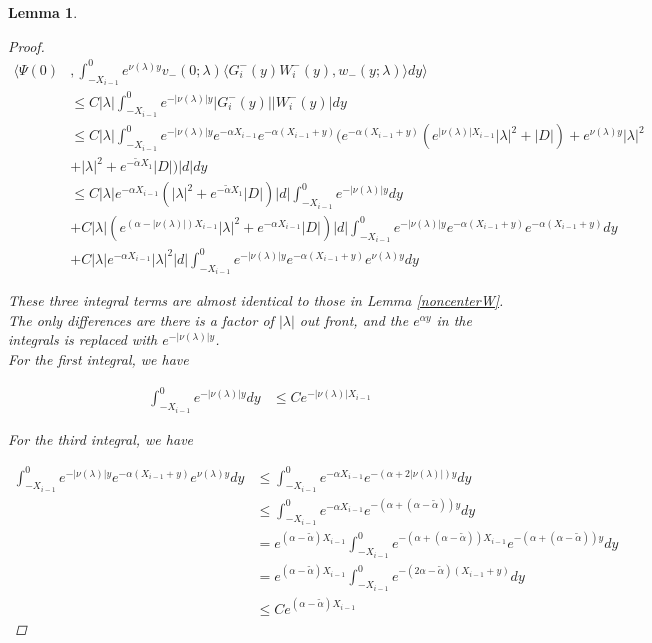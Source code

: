 \documentclass[12pt]{article}
\newtheorem{lemma}{Lemma}
\begin{document}
\begin{lemma}
\begin{proof}
\begin{align*}
\langle \Psi(0) &, \int_{-X_{i-1}}^0
e^{\nu(\lambda)y} v_-(0; \lambda) \langle G_i^-(y)W_i^-(y), w_-(y; \lambda) \rangle dy \rangle \\
&\leq C |\lambda| \int_{-X_{i-1}}^0 e^{-|\nu(\lambda)|y} |G_i^-(y)||W_i^-(y)| dy \\
&\leq C |\lambda| \int_{-X_{i-1}}^0 e^{-|\nu(\lambda)|y} e^{-\alpha X_{i-1}} e^{-\alpha(X_{i-1} + y)} \Big(e^{-\alpha(X_{i-1} + y)}( e^{|\nu(\lambda)| X_{i-1}} |\lambda|^2 + |D|) + e^{\nu(\lambda)y} |\lambda|^2 \\
&+ |\lambda|^2 + e^{-\tilde{\alpha} X_1} |D| \Big) |d| dy \\
&\leq C |\lambda| e^{-\alpha X_{i-1}} (|\lambda|^2 + e^{-\tilde{\alpha} X_1} |D| ) |d| \int_{-X_{i-1}}^0 e^{-|\nu(\lambda)|y} dy \\
&+ C |\lambda| ( e^{(\alpha - |\nu(\lambda)|) X_{i-1}} |\lambda|^2 + e^{-\alpha X_{i-1}} |D|)|d|\int_{-X_{i-1}}^0 e^{-|\nu(\lambda)|y} e^{-\alpha(X_{i-1} + y)} e^{-\alpha(X_{i-1} + y)} dy \\
&+ C |\lambda| e^{-\alpha X_{i-1}} |\lambda|^2 |d| \int_{-X_{i-1}}^0 e^{-|\nu(\lambda)|y} e^{-\alpha(X_{i-1} + y)} e^{\nu(\lambda)y} dy
\end{align*}

These three integral terms are almost identical to those in Lemma \ref{noncenterW}. The only differences are there is a factor of $|\lambda|$ out front, and the $e^{\alpha y}$ in the integrals is replaced with $e^{-|\nu(\lambda)|y}$. \\

For the first integral, we have

\begin{align*}
\int_{-X_{i-1}}^0 e^{-|\nu(\lambda)|y} dy &\leq C e^{-|\nu(\lambda)| X_{i-1}}
\end{align*}

For the third integral, we have

\begin{align*}
\int_{-X_{i-1}}^0 e^{-|\nu(\lambda)|y} e^{-\alpha(X_{i-1} + y)} e^{\nu(\lambda)y} dy
&\leq \int_{-X_{i-1}}^0 e^{-\alpha X_{i-1}} e^{-(\alpha + 2|\nu(\lambda)|) y} dy \\
&\leq \int_{-X_{i-1}}^0 e^{-\alpha X_{i-1}} e^{-(\alpha + (\alpha - \tilde{\alpha})) y} dy \\
&= e^{(\alpha - \tilde{\alpha}) X_{i-1}} \int_{-X_{i-1}}^0 e^{-(\alpha + (\alpha - \tilde{\alpha})) X_{i-1}} e^{-(\alpha + (\alpha - \tilde{\alpha})) y} dy \\
&= e^{(\alpha - \tilde{\alpha}) X_{i-1}} \int_{-X_{i-1}}^0 e^{-(2 \alpha - \tilde{\alpha})( X_{i-1} + y)} dy \\
&\leq C e^{(\alpha - \tilde{\alpha}) X_{i-1}}
\end{align*}


\end{proof}
\end{lemma}
\end{document}
